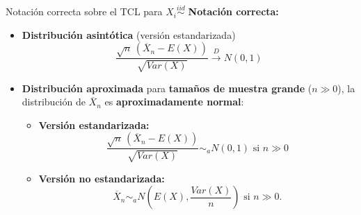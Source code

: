 \documentclass{beamer}
\theoremstyle{definition}
\begin{document}
\begin{frame}{\color{rosee} Notación correcta sobre el TCL para $X_i\stackrel{iid}{\sim}$}\small
\color{-red!70!} \textbf{Notación correcta:}\color{black}
\begin{itemize}
\item \textbf{Distribución asintótica} (versión estandarizada)
\[\frac{\sqrt{n} \,(\overline{X}_{n}-E(X))}{\sqrt{Var(X)}} \stackrel{D}{\to} N(0,1)\]
    \item \textbf{Distribución aproximada} para \textbf{tama\~nos de muestra grande}  ($n\gg 0$), la distribuci\'on de
    $\overline{X}_{n}$ es \textbf{aproximadamente normal}:
    \begin{itemize}
        \item \textbf{Versión estandarizada:} \[\frac{\sqrt{n} \,(\overline{X}_{n}-E(X))}{\sqrt{Var(X)}} \sim_a N(0,1) \text{ si }n \gg 0\]
    \item \textbf{Versión no estandarizada:}
    \[\overline{X}_{n} \sim_a N\left( E(X), \frac{Var(X)}{n} \right)\text{ si } n \gg 0.\]
    \end{itemize}
    \end{itemize}
    \end{frame}
    
    
 
\end{document}
